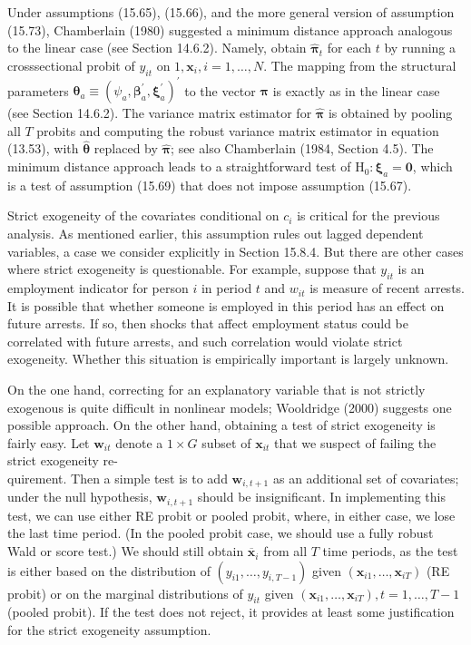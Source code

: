 \documentclass[10pt]{article}
\begin{document}
Under assumptions (15.65), (15.66), and the more general version of assumption (15.73), Chamberlain (1980) suggested a minimum distance approach analogous to the linear case (see Section 14.6.2). Namely, obtain $\hat{\boldsymbol{\pi}}_{t}$ for each $t$ by running a crosssectional probit of $y_{i t}$ on $1, \mathbf{x}_{i}, i=1, \ldots, N$. The mapping from the structural parameters $\boldsymbol{\theta}_{a} \equiv\left(\psi_{a}, \boldsymbol{\beta}_{a}^{\prime}, \boldsymbol{\xi}_{a}^{\prime}\right)^{\prime}$ to the vector $\boldsymbol{\pi}$ is exactly as in the linear case (see Section 14.6.2). The variance matrix estimator for $\hat{\boldsymbol{\pi}}$ is obtained by pooling all $T$ probits and computing the robust variance matrix estimator in equation (13.53), with $\hat{\boldsymbol{\theta}}$ replaced by $\hat{\boldsymbol{\pi}}$; see also Chamberlain (1984, Section 4.5). The minimum distance approach leads to a straightforward test of $\mathrm{H}_{0}: \boldsymbol{\xi}_{a}=\mathbf{0}$, which is a test of assumption (15.69) that does not impose assumption (15.67).

Strict exogeneity of the covariates conditional on $c_{i}$ is critical for the previous analysis. As mentioned earlier, this assumption rules out lagged dependent variables, a case we consider explicitly in Section 15.8.4. But there are other cases where strict exogeneity is questionable. For example, suppose that $y_{i t}$ is an employment indicator for person $i$ in period $t$ and $w_{i t}$ is measure of recent arrests. It is possible that whether someone is employed in this period has an effect on future arrests. If so, then shocks that affect employment status could be correlated with future arrests, and such correlation would violate strict exogeneity. Whether this situation is empirically important is largely unknown.

On the one hand, correcting for an explanatory variable that is not strictly exogenous is quite difficult in nonlinear models; Wooldridge (2000) suggests one possible approach. On the other hand, obtaining a test of strict exogeneity is fairly easy. Let $\mathbf{w}_{i t}$ denote a $1 \times G$ subset of $\mathbf{x}_{i t}$ that we suspect of failing the strict exogeneity re-\\
quirement. Then a simple test is to add $\mathbf{w}_{i, t+1}$ as an additional set of covariates; under the null hypothesis, $\mathbf{w}_{i, t+1}$ should be insignificant. In implementing this test, we can use either RE probit or pooled probit, where, in either case, we lose the last time period. (In the pooled probit case, we should use a fully robust Wald or score test.) We should still obtain $\overline{\mathbf{x}}_{i}$ from all $T$ time periods, as the test is either based on the distribution of $\left(y_{i 1}, \ldots, y_{i, T-1}\right)$ given $\left(\mathbf{x}_{i 1}, \ldots, \mathbf{x}_{i T}\right)$ (RE probit) or on the marginal distributions of $y_{i t}$ given $\left(\mathbf{x}_{i 1}, \ldots, \mathbf{x}_{i T}\right), t=1, \ldots, T-1$ (pooled probit). If the test does not reject, it provides at least some justification for the strict exogeneity assumption.
\end{document}

